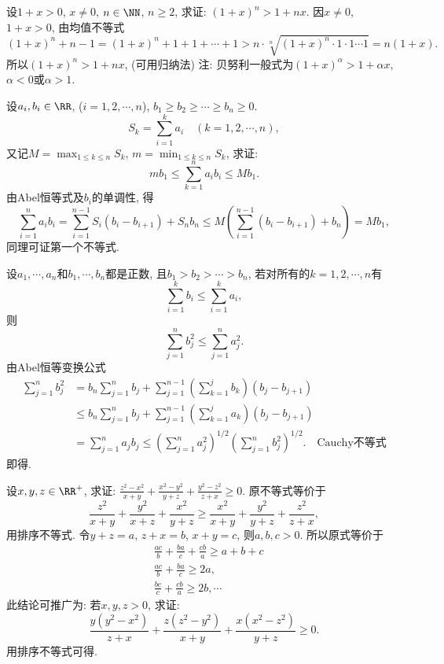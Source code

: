 设$1+x>0$, $x\ne0$, $n\in\NN$, $n\ge2$, 求证: $\left(1+x\right)^{n}>1+nx$.
\eq
\ba
因$x\ne0$, $1+x>0$, 由均值不等式
\[
\left(1+x\right)^{n}+n-1=\left(1+x\right)^{n}+1+1+\cdots+1>n\cdot\sqrt[n]{\left(1+x\right)^{n}\cdot1\cdot1\cdots1}=n\left(1+x\right).
\]
所以$\left(1+x\right)^{n}>1+nx$, (可用归纳法)
\ea
注: 贝努利一般式为$\left(1+x\right)^{\alpha}>1+\alpha x$, $\alpha<0$或$\alpha>1$.

设$a_{i},b_{i}\in\RR$, ($i=1,2,\cdots,n$), $b_{1}\ge b_{2}\ge\cdots\ge b_{n}\ge0$.
\[
S_{k}=\sum_{i=1}^{k}a_{i}\quad\left(k=1,2,\cdots,n\right),
\]
又记$M=\max_{1\le k\le n}S_{k}$, $m=\min_{1\le k\le n}S_{k}$, 求证:
\[
mb_{1}\le\sum_{k=1}^{n}a_{i}b_{i}\le Mb_{1}.
\]
\eq
\ba
由Abel恒等式及$b_{i}$的单调性, 得
\[
\sum_{i=1}^{n}a_{i}b_{i}=\sum_{i=1}^{n-1}S_{i}\left(b_{i}-b_{i+1}\right)+S_{n}b_{n}\le M\left(\sum_{i=1}^{n-1}\left(b_{i}-b_{i+1}\right)+b_{n}\right)=Mb_{1},
\]
同理可证第一个不等式.
\ea

设$a_{1},\cdots,a_{n}$和$b_{1},\cdots,b_{n}$都是正数, 且$b_{1}>b_{2}>\cdots>b_{n}$,
若对所有的$k=1,2,\cdots,n$有
\[
\sum_{i=1}^{k}b_{i}\le\sum_{i=1}^{k}a_{i},
\]
则
\[
\sum_{j=1}^{n}b_{j}^{2}\le\sum_{j=1}^{n}a_{j}^{2}.
\]
\eq
\ba
由Abel恒等变换公式
\[
\begin{aligned}\sum_{j=1}^{n}b_{j}^{2} & =b_{n}\sum_{j=1}^{n}b_{j}+\sum_{j=1}^{n-1}\left(\sum_{k=1}^{j}b_{k}\right)\left(b_{j}-b_{j+1}\right)\\
 & \le b_{n}\sum_{j=1}^{n}b_{j}+\sum_{j=1}^{n-1}\left(\sum_{k=1}^{j}a_{k}\right)\left(b_{j}-b_{j+1}\right)\\
 & =\sum_{j=1}^{n}a_{j}b_{j}
 \le\left(\sum_{j=1}^{n}a_{j}^{2}\right)^{1/2}\left(\sum_{j=1}^{n}b_{j}^{2}\right)^{1/2}.\quad\text{Cauchy不等式}
\end{aligned}
\]
即得.
\ea

设$x,y,z\in\RR^{+}$, 求证: $\frac{z^{2}-x^{2}}{x+y}+\frac{x^{2}-y^{2}}{y+z}+\frac{y^{2}-z^{2}}{z+x}\ge0$.
\eq
\ba
原不等式等价于
\[
\frac{z^{2}}{x+y}+\frac{y^{2}}{x+z}+\frac{x^{2}}{y+z}\ge\frac{x^{2}}{x+y}+\frac{y^{2}}{y+z}+\frac{z^{2}}{z+x},
\]
用排序不等式.
\ea
\ba
令$y+z=a$, $z+x=b$, $x+y=c$, 则$a,b,c>0$. 所以原式等价于
\[
\begin{aligned} & \frac{ac}{b}+\frac{ba}{c}+\frac{cb}{a}\ge a+b+c\\
 & \frac{ac}{b}+\frac{ba}{c}\ge2a,\\
 & \frac{bc}{c}+\frac{cb}{a}\ge2b,\cdots
\end{aligned}
\]
此结论可推广为: 若$x,y,z>0$, 求证:
\[
\frac{y\left(y^{2}-x^{2}\right)}{z+x}+\frac{z\left(z^{2}-y^{2}\right)}{x+y}+\frac{x\left(x^{2}-z^{2}\right)}{y+z}\ge0.
\]
用排序不等式可得.
\ea

